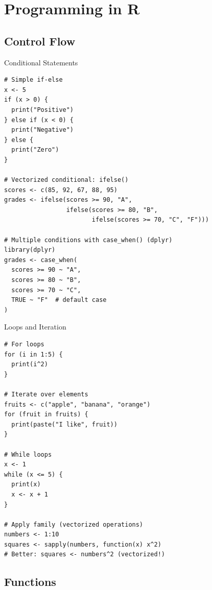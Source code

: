 \documentclass[aspectratio=169]{beamer}
\begin{document}
\section{Programming in R}

\subsection{Control Flow}

\begin{frame}[fragile]{Conditional Statements}
\begin{lstlisting}
# Simple if-else
x <- 5
if (x > 0) {
  print("Positive")
} else if (x < 0) {
  print("Negative")
} else {
  print("Zero")
}

# Vectorized conditional: ifelse()
scores <- c(85, 92, 67, 88, 95)
grades <- ifelse(scores >= 90, "A",
                 ifelse(scores >= 80, "B",
                        ifelse(scores >= 70, "C", "F")))

# Multiple conditions with case_when() (dplyr)
library(dplyr)
grades <- case_when(
  scores >= 90 ~ "A",
  scores >= 80 ~ "B",
  scores >= 70 ~ "C",
  TRUE ~ "F"  # default case
)
\end{lstlisting}
\end{frame}

\begin{frame}[fragile]{Loops and Iteration}
\begin{lstlisting}
# For loops
for (i in 1:5) {
  print(i^2)
}

# Iterate over elements
fruits <- c("apple", "banana", "orange")
for (fruit in fruits) {
  print(paste("I like", fruit))
}

# While loops
x <- 1
while (x <= 5) {
  print(x)
  x <- x + 1
}

# Apply family (vectorized operations)
numbers <- 1:10
squares <- sapply(numbers, function(x) x^2)
# Better: squares <- numbers^2 (vectorized!)
\end{lstlisting}
\end{frame}

\subsection{Functions}
\end{document}
